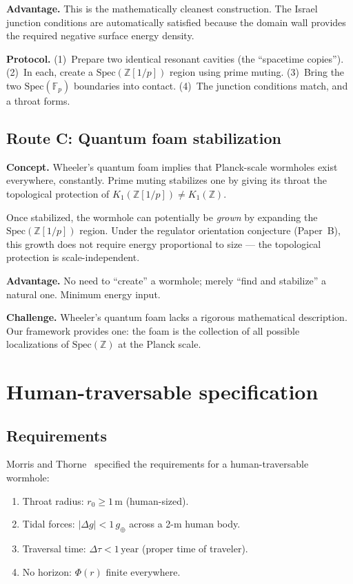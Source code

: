 \documentclass[11pt,a4paper]{article}
\newcommand{\Spec}{\mathrm{Spec}}
\newcommand{\Zp}{\mathbb{Z}[1/p]}
\begin{document}
\textbf{Advantage.} This is the mathematically cleanest
construction. The Israel junction conditions are automatically
satisfied because the domain wall provides the required negative
surface energy density.

\textbf{Protocol.}
(1)~Prepare two identical resonant cavities (the ``spacetime copies'').
(2)~In each, create a $\Spec(\Zp)$ region using prime muting.
(3)~Bring the two $\Spec(\mathbb{F}_p)$ boundaries into contact.
(4)~The junction conditions match, and a throat forms.

\subsection{Route C: Quantum foam stabilization}

\textbf{Concept.} Wheeler's quantum foam implies that Planck-scale
wormholes exist everywhere, constantly. Prime muting stabilizes
one by giving its throat the topological protection of
$K_1(\Zp) \neq K_1(\mathbb{Z})$.

Once stabilized, the wormhole can potentially be \emph{grown}
by expanding the $\Spec(\Zp)$ region. Under the regulator
orientation conjecture (Paper~B), this growth does not require
energy proportional to size --- the topological protection is
scale-independent.

\textbf{Advantage.} No need to ``create'' a wormhole; merely
``find and stabilize'' a natural one. Minimum energy input.

\textbf{Challenge.} Wheeler's quantum foam lacks a rigorous
mathematical description. Our framework provides one:
the foam is the collection of all possible localizations
of $\Spec(\mathbb{Z})$ at the Planck scale.

\section{Human-traversable specification}
\label{sec:spec}

\subsection{Requirements}

Morris and Thorne~\cite{MorrisThorne1988} specified the
requirements for a human-traversable wormhole:
\begin{enumerate}
\item Throat radius: $r_0 \geq 1\,\mathrm{m}$ (human-sized).
\item Tidal forces: $|\Delta g| < 1\,g_\oplus$ across a
  2-m human body.
\item Traversal time: $\Delta\tau < 1\,\mathrm{year}$
  (proper time of traveler).
\item No horizon: $\Phi(r)$ finite everywhere.
\end{enumerate}
\end{document}
